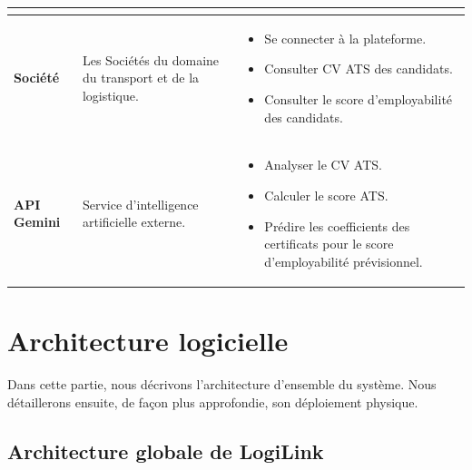 \begin{table}[H]
\begin{tabularx}{\textwidth}{|>{\bfseries}l|X|>{\RaggedRight\arraybackslash}X|}
\begin{minipage}[t]{\linewidth}
  \end{minipage} \\
\hline
Société
& Les Sociétés du domaine du transport et de la logistique.
& \begin{minipage}[t]{\linewidth}\vspace{4pt}
  \begin{itemize}[nosep,leftmargin=*,before=\raggedright]
    \item Se connecter à la plateforme.
    \item Consulter CV ATS des candidats.
    \item Consulter le score d’employabilité des candidats.
  \end{itemize}
  \vspace{4pt}
  \end{minipage} \\
\hline
API Gemini
& Service d'intelligence artificielle externe.
& \begin{minipage}[t]{\linewidth}\vspace{4pt}
  \begin{itemize}[nosep,leftmargin=*,before=\raggedright]
    \item Analyser le CV ATS.
    \item Calculer le score ATS.
    \item Prédire les coefficients des certificats pour le score d'employabilité prévisionnel.
  \end{itemize}
  \vspace{4pt}
  \end{minipage} \\
\hline
\end{tabularx}
\end{table}

\section{Architecture logicielle}

Dans cette partie, nous décrivons l'architecture d'ensemble du système. Nous détaillerons ensuite, de façon plus approfondie, son déploiement physique.

\subsection{Architecture globale de LogiLink}

